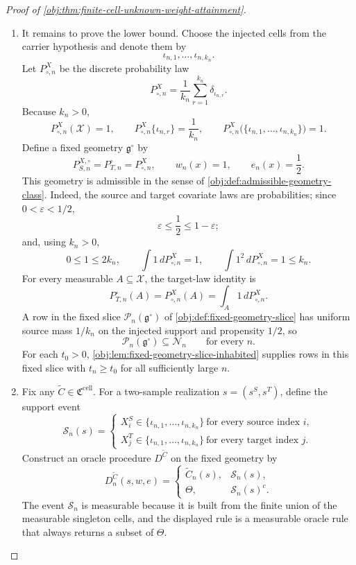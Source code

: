\documentclass[11pt]{article}
\begin{document}
\begin{proof}[Proof of \cref{obj:thm:finite-cell-unknown-weight-attainment}]
\begin{enumerate}
\item
It remains to prove the lower bound.  Choose the injected cells from the carrier hypothesis and denote them by
\[
\iota_{n,1},\ldots,\iota_{n,k_n}.
\]
Let \(P_{\circ,n}^X\) be the discrete probability law
\[
P_{\circ,n}^X
=
\frac1{k_n}\sum_{r=1}^{k_n}\delta_{\iota_{n,r}}.
\]
Because \(k_n>0\),
\[
P_{\circ,n}^X(\mathcal X)=1,
\qquad
P_{\circ,n}^X\{\iota_{n,r}\}=\frac1{k_n},
\qquad
P_{\circ,n}^X\bigl(\{\iota_{n,1},\ldots,\iota_{n,k_n}\}\bigr)=1 .
\]
Define a fixed geometry \(\mathfrak g^\circ\) by
\[
P_{S,n}^{X,\circ}=P_{T,n}^{\circ}=P_{\circ,n}^X,
\qquad
w_n(x)=1,
\qquad
e_n(x)=\frac12 .
\]
This geometry is admissible in the sense of \cref{obj:def:admissible-geometry-class}.  Indeed, the source and target covariate laws are probabilities; since \(0<\varepsilon<1/2\),
\[
\varepsilon\le \frac12\le 1-\varepsilon;
\]
and, using \(k_n>0\),
\[
0\le 1\le 2k_n,
\qquad
\int 1\,dP_{\circ,n}^X=1,
\qquad
\int 1^2\,dP_{\circ,n}^X=1\le k_n.
\]
For every measurable \(A\subseteq\mathcal X\), the target-law identity is
\[
P_{T,n}^{\circ}(A)
=
P_{\circ,n}^X(A)
=
\int_A 1\,dP_{\circ,n}^X .
\]
A row in the fixed slice \(\mathcal P_n(\mathfrak g^\circ)\) of \cref{obj:def:fixed-geometry-slice} has uniform source mass \(1/k_n\) on the injected support and propensity \(1/2\), so
\[
\mathcal P_n(\mathfrak g^\circ)\subseteq \mathcal N_n
\qquad\text{for every }n.
\]
For each \(t_0>0\), \cref{obj:lem:fixed-geometry-slice-inhabited} supplies rows in this fixed slice with \(t_n\ge t_0\) for all sufficiently large \(n\).

\item
Fix any \(\widetilde C\in\mathfrak C^{\mathrm{cell}}\).  For a two-sample realization \(s=(s^S,s^T)\), define the support event
\[
\mathcal S_n(s)
=
\left\{
\begin{array}{l}
X_i^S\in\{\iota_{n,1},\ldots,\iota_{n,k_n}\}\ \text{for every source index }i,\\[2mm]
X_j^T\in\{\iota_{n,1},\ldots,\iota_{n,k_n}\}\ \text{for every target index }j .
\end{array}
\right.
\]
Construct an oracle procedure \(D^{\widetilde C}\) on the fixed geometry by
\[
D^{\widetilde C}_n(s,w,e)
=
\begin{cases}
\widetilde C_n(s), & \mathcal S_n(s),\\
\Theta, & \mathcal S_n(s)^c .
\end{cases}
\]
The event \(\mathcal S_n\) is measurable because it is built from the finite union of the measurable singleton cells, and the displayed rule is a measurable oracle rule that always returns a subset of \(\Theta\).


\end{enumerate}
\end{proof}
\end{document}
